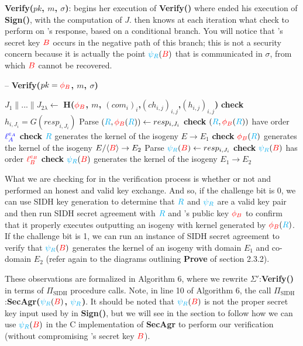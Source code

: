 \noindent
\textbf{Verify($pk$, $m$, $\sigma$)}: \alice begins her execution of \textbf{Verify()} where \bob ended his execution of \textbf{Sign()}, with the computation of $J$. \alice then knows at each iteration what check to perform on \bob's response, based on a conditional branch. You will notice that \bob's secret key $\textcolor{red}{B}$ occurs in the negative path of this branch; this is not a security concern because it is actually the point $\textcolor{cyan}{\psi_R}(\textcolor{red}{B})$ that is communicated in $\sigma$, from which $\textcolor{red}{B}$ cannot be recovered.\\

\begin{algorithm}[H]
\caption{-- \textbf{Verify($pk = \textcolor{red}{\phi_B}$, $m$, $\sigma$)}}\label{euclid}
\begin{algorithmic}[1]
\State $J_{1} \parallel ... \parallel J_{2\lambda} \gets$ \textbf{H($\textcolor{red}{\phi_B}$, $m$, $(com_{i})_{i}$,$(ch_{i,j})_{i,j}$,$(h_{i,j})_{i,j}$)}
	\State \textbf{check} $h_{i,J_{i}} = G(resp_{i,J_{i}})$
		\State Parse $(\textcolor{cyan}{R},\textcolor{red}{\phi_B}(\textcolor{cyan}{R})) \gets resp_{i,J_{i}}$
		\State \textbf{check} $(\textcolor{cyan}{R}, \textcolor{red}{\phi_B}(\textcolor{cyan}{R}))$ have order $\textcolor{blue}{\ell_{A}^{e_A}}$
		\State \textbf{check} $\textcolor{cyan}{R}$ generates the kernel of the isogeny $E \rightarrow E_{1}$
		\State \textbf{check} $\textcolor{red}{\phi_B}(\textcolor{cyan}{R})$ generates the kernel of the isogeny $E/\langle \textcolor{red}{B} \rangle \rightarrow E_{2}$
	\Else
		\State Parse $\textcolor{cyan}{\psi_R}(\textcolor{red}{B}) \gets resp_{i,J_{i}}$
		\State \textbf{check} $\textcolor{cyan}{\psi_R}(\textcolor{red}{B})$ has order $\textcolor{red}{\ell_{B}^{e_B}}$
		\State \textbf{check} $\textcolor{cyan}{\psi_R}(\textcolor{red}{B})$ generates the kernel of the isogeny $E_{1} \rightarrow E_{2}$
	\EndIf
\EndFor

	\State {}
\Else
	\State {}
\EndIf
\end{algorithmic}
\end{algorithm}

\noindent
What we are checking for in the verification process is whether or not \bob and \randall performed an honest and valid key exchange. And so, if the challenge bit is 0, we can use SIDH key generation to determine that $\textcolor{cyan}{R}$ and $\textcolor{cyan}{\psi_R}$ are a valid key pair and then run SIDH secret agreement with $\textcolor{cyan}{R}$ and \bob's public key $\textcolor{red}{\phi_B}$ to confirm that it properly executes outputting an isogeny with kernel generated by $\textcolor{red}{\phi_B}(\textcolor{cyan}{R})$. If the challenge bit is 1, we can run an instance of SIDH secret agreement to verify that $\textcolor{cyan}{\psi_R}(\textcolor{red}{B})$ generates the kernel of an isogeny with domain $E_{1}$ and co-domain $E_{2}$ (refer again to the diagrams outlining \textbf{Prove} of section 2.3.2).

These observations are formalized in Algorithm 6, where we rewrite $\Sigma'$:\textbf{Verify()} in terms of $\Pi_{\text{SIDH}}$ procedure calls. Note, in line 10 of Algorithm 6, the call $\Pi_{\text{SIDH}}$:\textbf{SecAgr($\textcolor{cyan}{\psi_R}(\textcolor{red}{B})$, $\textcolor{cyan}{\psi_R}$)}. It should be noted that $\textcolor{cyan}{\psi_R}(\textcolor{red}{B})$ is not the proper secret key input used by \bob in \textbf{Sign()}, but we will see in the section to follow how we can use $\textcolor{cyan}{\psi_R}(\textcolor{red}{B})$ in the C implementation of \textbf{SecAgr} to perform our verification (without compromising \bob's secret key $\textcolor{red}{B}$).

